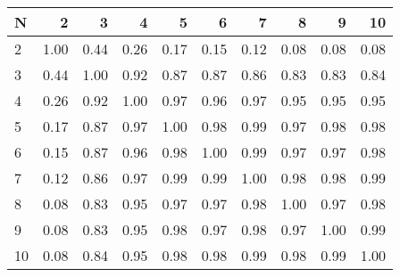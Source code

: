\begin{tabular}{lrrrrrrrrr}
\toprule
N &    2  &    3  &    4  &    5  &    6  &    7  &    8  &    9  &    10 \\
\midrule
2  &  1.00 &  0.44 &  0.26 &  0.17 &  0.15 &  0.12 &  0.08 &  0.08 &  0.08 \\
3  &  0.44 &  1.00 &  0.92 &  0.87 &  0.87 &  0.86 &  0.83 &  0.83 &  0.84 \\
4  &  0.26 &  0.92 &  1.00 &  0.97 &  0.96 &  0.97 &  0.95 &  0.95 &  0.95 \\
5  &  0.17 &  0.87 &  0.97 &  1.00 &  0.98 &  0.99 &  0.97 &  0.98 &  0.98 \\
6  &  0.15 &  0.87 &  0.96 &  0.98 &  1.00 &  0.99 &  0.97 &  0.97 &  0.98 \\
7  &  0.12 &  0.86 &  0.97 &  0.99 &  0.99 &  1.00 &  0.98 &  0.98 &  0.99 \\
8  &  0.08 &  0.83 &  0.95 &  0.97 &  0.97 &  0.98 &  1.00 &  0.97 &  0.98 \\
9  &  0.08 &  0.83 &  0.95 &  0.98 &  0.97 &  0.98 &  0.97 &  1.00 &  0.99 \\
10 &  0.08 &  0.84 &  0.95 &  0.98 &  0.98 &  0.99 &  0.98 &  0.99 &  1.00 \\
\bottomrule
\end{tabular}
